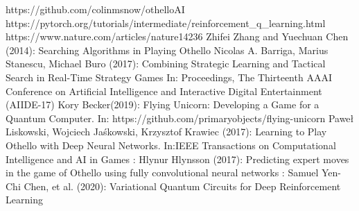 \documentclass[conference]{IEEEtran}
\begin{document}
\begin{thebibliography}{00}
 https://github.com/colinmsnow/othelloAI
 https://pytorch.org/tutorials/intermediate/reinforcement\_q\_learning.html
 https://www.nature.com/articles/nature14236
 Zhifei Zhang and Yuechuan Chen (2014): Searching Algorithms in Playing Othello
 Nicolas A. Barriga, Marius Stanescu, Michael Buro (2017): Combining Strategic Learning and Tactical Search in Real-Time Strategy Games In: Proceedings, The Thirteenth AAAI Conference on Artificial Intelligence and Interactive Digital Entertainment (AIIDE-17)
 Kory Becker(2019): Flying Unicorn: Developing a Game for a Quantum Computer. In: https://github.com/primaryobjects/flying-unicorn
 Paweł Liskowski, Wojciech Jaśkowski, Krzysztof Krawiec (2017): Learning to Play Othello with Deep Neural
Networks. In:IEEE Transactions on Computational Intelligence and AI in Games
: Hlynur Hlynsson (2017): Predicting expert moves in the game of Othello using fully convolutional neural networks
: Samuel Yen-Chi Chen, et al. (2020): Variational Quantum Circuits for Deep Reinforcement Learning
\end{thebibliography}
\vspace{12pt}
\end{document}
